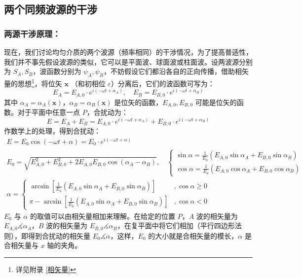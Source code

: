 \documentclass[UTF8]{report}
\theoremstyle{MyLineTheoremStyle} %
\theoremstyle{MyBlockTheoremStyle} %
\theoremstyle{MySubsubsectionStyle} %
\begin{document}
\subsection{两个同频波源的干涉}

\subsubsection{两源干涉原理：}

现在，我们讨论均匀介质的两个波源（频率相同）的干涉情况，为了提高普适性，我们并不事先假设波源的类似，它可以是平面波、球面波或柱面波。设两波源分别为 $S_A, S_B$，波函数分别为 $\psi_A, \psi_B$，不妨假设它们都沿各自的正向传播，借助相矢量的思想\footnote{详见附录 \ref{相矢量}}，将位矢 $\boldsymbol{x}$ （和初相位 $\varepsilon$）分离后，它们的波函数可写为：
\begin{equation}
    E_A = E_{A,0}\cdot e^{i(-\omega t + \alpha_A)},\quad E_B = E_{B,0}\cdot e^{i(-\omega t + \alpha_B)}
\end{equation}
其中 $\alpha_A = \alpha_A(\boldsymbol{x})$，$\alpha_B = \alpha_B(\boldsymbol{x})$ 是位矢的函数，$E_{A,0}, E_{B,0}$ 可能是位矢的函数。对于平面中任意一点 $P$，合扰动为：
\begin{equation}
E = E_A + E_B = E_{A,0}\cdot e^{i(-\omega t + \alpha_A)} + E_{B,0}\cdot e^{i(-\omega t + \alpha_B)}
\end{equation}
作数学上的处理，得到合扰动：
\begin{gather}
    E = E_0 \cos \left(-\omega t + \alpha \right) = E_0 \cdot e^{i(-\omega t + \alpha)}\\ 
    E_0 = \sqrt{E_{A,0}^2 + E_{B,0}^2 + 2E_{A,0}E_{B,0}\cos(\alpha_A - \alpha_B)},\quad 
    \begin{cases}
        \sin \alpha = \frac{1}{E_0}\left( E_{A,0}\sin \alpha_A + E_{B,0}\sin \alpha_B \right) \\
        \cos \alpha = \frac{1}{E_0}\left( E_{A,0}\cos \alpha_A + E_{B,0}\cos \alpha_B \right) 
    \end{cases} \\ 
    \alpha = 
    \begin{cases}
        \arcsin \left[ \frac{1}{E_0}\left( E_{A,0}\sin \alpha_A + E_{B,0}\sin \alpha_B \right)  \right] &, \cos \alpha \geqslant 0 \\
        \pi - \arcsin \left[ \frac{1}{E_0}\left( E_{A,0}\sin \alpha_A + E_{B,0}\sin \alpha_B \right)  \right] &,  \cos \alpha < 0
    \end{cases}
\end{gather}
$E_0$ 与 $\alpha$ 的取值可以由相矢量相加来理解。在给定的位置 $P$，$A$ 波的相矢量为 $E_{A,0}\measuredangle \alpha_A$，$B$ 波的相矢量为 $E_{B,0}\measuredangle \alpha_B$，在复平面中将它们相加（平行四边形法则），即得到合扰动的相矢量  $E_0\measuredangle \alpha$，这样，$E_0$ 的大小就是合相矢量的模长，$\alpha$ 是合相矢量与 $x$ 轴的夹角。
\end{document}
